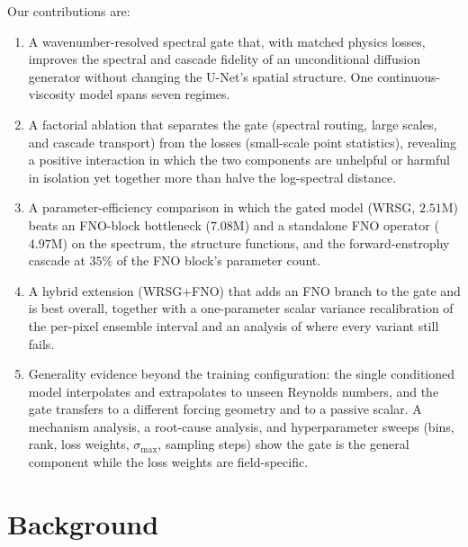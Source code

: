 \documentclass[10pt]{article} %
\begin{document}
Our contributions are:
\begin{enumerate}
\item A wavenumber-resolved spectral gate that, with matched physics losses, improves the spectral and cascade fidelity of an unconditional diffusion generator without changing the U-Net's spatial structure. One continuous-viscosity model spans seven regimes.
\item A factorial ablation that separates the gate (spectral routing, large scales, and cascade transport) from the losses (small-scale point statistics), revealing a positive interaction in which the two components are unhelpful or harmful in isolation yet together more than halve the log-spectral distance.
\item A parameter-efficiency comparison in which the gated model (WRSG, $2.51$M) beats an FNO-block bottleneck ($7.08$M) and a standalone FNO operator ($4.97$M) on the spectrum, the structure functions, and the forward-enstrophy cascade at $35\%$ of the FNO block's parameter count.
\item A hybrid extension (WRSG+FNO) that adds an FNO branch to the gate and is best overall, together with a one-parameter scalar variance recalibration of the per-pixel ensemble interval and an analysis of where every variant still fails.
\item Generality evidence beyond the training configuration: the single conditioned model interpolates and extrapolates to unseen Reynolds numbers, and the gate transfers to a different forcing geometry and to a passive scalar. A mechanism analysis, a root-cause analysis, and hyperparameter sweeps (bins, rank, loss weights, $\sigma_{\max}$, sampling steps) show the gate is the general component while the loss weights are field-specific.
\end{enumerate}

\section{Background}
\label{sec:background}
\end{document}
